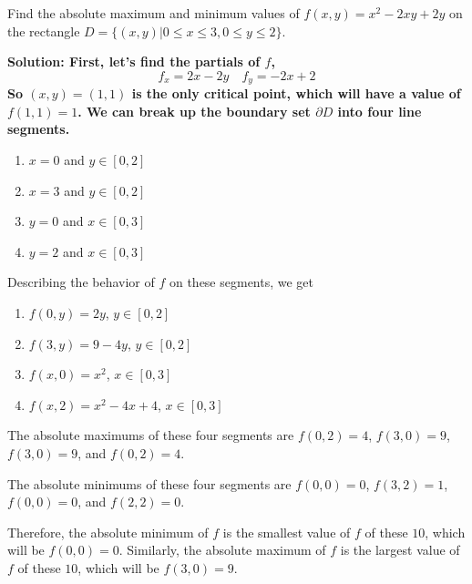 \begin{example}
    Find the absolute maximum and minimum values of \(f(x,y)=x^2-2xy+2y\) on the rectangle \(D=\{(x,y)|0\leq x\leq 3, 0\leq y\leq 2\}\).
    \par\bf{Solution: }First, let's find the partials of \(f\),
    \[ f_x = 2x-2y \quad f_y = -2x+2 \]
    So \((x,y) = (1, 1)\) is the only critical point, which will have a value of \(f(1, 1) = 1\). We can break up the boundary set \(\partial D\) into four line segments. 
    \begin{enumerate}
        \item \(x=0\) and \(y\in[0, 2]\)
        \item \(x=3\) and \(y\in[0,2]\)
        \item \(y=0\) and \(x\in[0,3]\)
        \item \(y=2\) and \(x\in[0,3]\)
    \end{enumerate}
    Describing the behavior of \(f\) on these segments, we get
    \begin{enumerate}
        \item \(f(0, y) = 2y\), \(y\in[0, 2]\)
        \item \(f(3, y) = 9 - 4y\), \(y\in[0,2]\)
        \item \(f(x,0) = x^2\), \(x\in[0, 3]\)
        \item \(f(x, 2) = x^2-4x+4\), \(x\in[0, 3]\)
    \end{enumerate}
The absolute maximums of these four segments are \(f(0, 2) = 4\), \(f(3, 0) = 9\), \(f(3, 0) = 9\), and \(f(0,2) = 4\). \par
The absolute minimums of these four segments are \(f(0, 0)=0\), \(f(3, 2)=1\), \(f(0,0)=0\), and \(f(2, 2)=0\). 

\par Therefore, the absolute minimum of \(f\) is the smallest value of \(f\) of these \(10\), which will be \(f(0, 0) = 0\). Similarly, the absolute maximum of \(f\) is the largest value of \(f\) of these \(10\), which will be \(f(3, 0)=9\).
\end{example}
